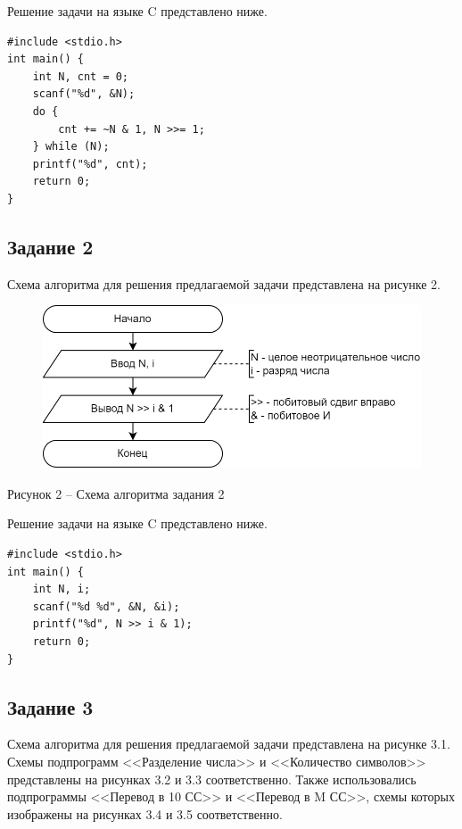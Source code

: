 \documentclass[a4paper,14pt]{extarticle}
\begin{document}
	Решение задачи на языке C представлено ниже.
	
	\begin{lstlisting}[tabsize=2,basicstyle=\ttfamily]
#include <stdio.h>
int main() {
	int N, cnt = 0;
	scanf("%d", &N);
	do {
		cnt += ~N & 1, N >>= 1;
	} while (N);
	printf("%d", cnt);
	return 0;
}
	\end{lstlisting}
	
	\subsection*{Задание 2}
	Схема алгоритма для решения предлагаемой задачи представлена на рисунке 2.
	
	\begin{figure}[h]
		\centering
		\includegraphics[width=0.68\linewidth]{schemes/s-2}
	\end{figure}
	\begin{center}
		Рисунок 2 – Схема алгоритма задания 2
	\end{center}
	
	Решение задачи на языке C представлено ниже.
	
	\begin{lstlisting}[tabsize=2,basicstyle=\ttfamily]
#include <stdio.h>
int main() {
	int N, i;
	scanf("%d %d", &N, &i);
	printf("%d", N >> i & 1);
	return 0;
}
	\end{lstlisting}
	
	\newpage
	\subsection*{Задание 3}
	Схема алгоритма для решения предлагаемой задачи представлена на рисунке 3.1. Схемы подпрограмм <<Разделение числа>> и <<Количество символов>> представлены на рисунках 3.2 и 3.3 соответственно. Также использовались подпрограммы <<Перевод в 10 СС>> и <<Перевод в M СС>>, схемы которых изображены на рисунках 3.4 и 3.5 соответственно.
	
\end{document}
